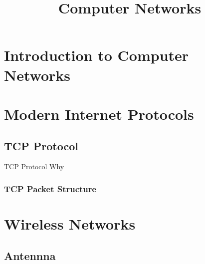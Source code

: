 \documentclass[a4paper,10pt]{article}
\title{Computer Networks}
\author{}
\date{}
\begin{document}
\maketitle
\section{Introduction to Computer Networks}
\section{Modern Internet Protocols}
\subsection{TCP Protocol}

\indent TCP Protocol
Why
\subsubsection{TCP Packet Structure}
\section{Wireless Networks}
\subsection{Antennna}
\end{document}
